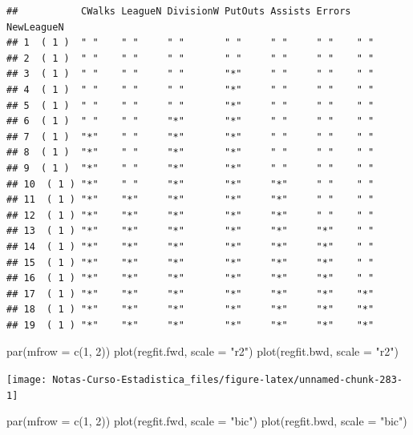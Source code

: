 \documentclass[
  12pt,
]{book}
\newenvironment{Shaded}{\begin{snugshade}}{\end{snugshade}}
\newcommand{\AttributeTok}[1]{\textcolor[rgb]{0.77,0.63,0.00}{#1}}
\newcommand{\DecValTok}[1]{\textcolor[rgb]{0.00,0.00,0.81}{#1}}
\newcommand{\FunctionTok}[1]{\textcolor[rgb]{0.00,0.00,0.00}{#1}}
\newcommand{\NormalTok}[1]{#1}
\newcommand{\StringTok}[1]{\textcolor[rgb]{0.31,0.60,0.02}{#1}}
\theoremstyle{definition}
\theoremstyle{definition}
\theoremstyle{definition}
\theoremstyle{remark}
\begin{document}
\begin{verbatim}
##           CWalks LeagueN DivisionW PutOuts Assists Errors NewLeagueN
## 1  ( 1 )  " "    " "     " "       " "     " "     " "    " "       
## 2  ( 1 )  " "    " "     " "       " "     " "     " "    " "       
## 3  ( 1 )  " "    " "     " "       "*"     " "     " "    " "       
## 4  ( 1 )  " "    " "     " "       "*"     " "     " "    " "       
## 5  ( 1 )  " "    " "     " "       "*"     " "     " "    " "       
## 6  ( 1 )  " "    " "     "*"       "*"     " "     " "    " "       
## 7  ( 1 )  "*"    " "     "*"       "*"     " "     " "    " "       
## 8  ( 1 )  "*"    " "     "*"       "*"     " "     " "    " "       
## 9  ( 1 )  "*"    " "     "*"       "*"     " "     " "    " "       
## 10  ( 1 ) "*"    " "     "*"       "*"     "*"     " "    " "       
## 11  ( 1 ) "*"    "*"     "*"       "*"     "*"     " "    " "       
## 12  ( 1 ) "*"    "*"     "*"       "*"     "*"     " "    " "       
## 13  ( 1 ) "*"    "*"     "*"       "*"     "*"     "*"    " "       
## 14  ( 1 ) "*"    "*"     "*"       "*"     "*"     "*"    " "       
## 15  ( 1 ) "*"    "*"     "*"       "*"     "*"     "*"    " "       
## 16  ( 1 ) "*"    "*"     "*"       "*"     "*"     "*"    " "       
## 17  ( 1 ) "*"    "*"     "*"       "*"     "*"     "*"    "*"       
## 18  ( 1 ) "*"    "*"     "*"       "*"     "*"     "*"    "*"       
## 19  ( 1 ) "*"    "*"     "*"       "*"     "*"     "*"    "*"
\end{verbatim}

\begin{Shaded}
\begin{Highlighting}[]
\FunctionTok{par}\NormalTok{(}\AttributeTok{mfrow =} \FunctionTok{c}\NormalTok{(}\DecValTok{1}\NormalTok{, }\DecValTok{2}\NormalTok{))}
\FunctionTok{plot}\NormalTok{(regfit.fwd, }\AttributeTok{scale =} \StringTok{"r2"}\NormalTok{)}
\FunctionTok{plot}\NormalTok{(regfit.bwd, }\AttributeTok{scale =} \StringTok{"r2"}\NormalTok{)}
\end{Highlighting}
\end{Shaded}

\begin{center}\texttt{[image: Notas-Curso-Estadistica\_files/figure-latex/unnamed-chunk-283-1]} \end{center}

\begin{Shaded}
\begin{Highlighting}[]
\FunctionTok{par}\NormalTok{(}\AttributeTok{mfrow =} \FunctionTok{c}\NormalTok{(}\DecValTok{1}\NormalTok{, }\DecValTok{2}\NormalTok{))}
\FunctionTok{plot}\NormalTok{(regfit.fwd, }\AttributeTok{scale =} \StringTok{"bic"}\NormalTok{)}
\FunctionTok{plot}\NormalTok{(regfit.bwd, }\AttributeTok{scale =} \StringTok{"bic"}\NormalTok{)}
\end{Highlighting}
\end{Shaded}
\end{document}
